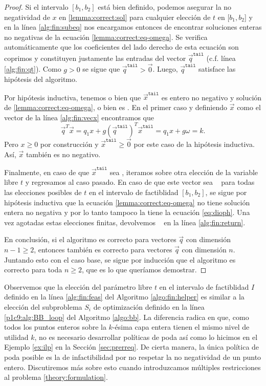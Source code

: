 \begin{proof}
	Si el intervalo $[b_1, b_2]$ está bien definido, podemos asegurar la no negatividad de $x$ en
	\eqref{lemma:correct:sol} para cualquier elección de $t$ en $[b_1, b_2$] y en
	la línea \ref{alg:fin:subeq} nos encargamos entonces de encontrar soluciones enteras no negativas
	de la ecuación \eqref{lemma:correct:eq-omega}. Se verifica automáticamente que los coeficientes
	del lado derecho de esta ecuación son coprimos y constituyen justamente las entradas del vector
	$\vec{q}^{\texttt{tail}}$ (c.f. línea \ref{alg:fin:qt}). Como $g > 0$ se sigue que
	$\vec{q}^{\texttt{tail}} > \vec{0}$. Luego, $\vec{q}^{\texttt{tail}}$ satisface las hipótesis
	del algoritmo.

	Por hipótesis inductiva, tenemos o bien que $\vec{x}^{\texttt{tail}}$ es entero no negativo y
	solución de \eqref{lemma:correct:eq-omega}, o bien es \NIL. En el primer caso y definiendo
	$\vec{x}$ como el vector de la línea \ref{alg:fin:vecx} encontramos que
	\begin{equation*}
		\vec{q}^T\vec{x} = q_1x + g\left(\vec{q}^{\texttt{tail}}\right)^T\vec{x}^{\texttt{tail}}
		= q_1x + g\omega = k.
	\end{equation*}
	Pero $x \geq 0$ por construcción y $\vec{x}^{\texttt{tail}} \geq \vec{0}$ por este caso de la
	hipótesis inductiva. Así, $\vec{x}$ también es no negativo.

	Finalmente, en caso de que $\vec{x}^{\texttt{tail}}$ sea \NIL, iteramos sobre otra elección de
	la variable libre $t$ y regresamos al caso pasado. En caso de que este vector sea \NIL~ para
	todas las elecciones posibles de $t$ en el intervalo de factiblidad $[b_1, b_2]$, se sigue por
	hipótesis inductiva que la ecuación \eqref{lemma:correct:eq-omega} no tiene solución entera no
	negativa y por lo tanto tampoco la tiene la ecuación \eqref{eq:dioph}. Una vez agotadas estas
	elecciones finitas, devolvemos \NIL~ en la línea \ref{alg:fin:return}.

	En conclusión, si el algoritmo es correcto para vectores $\vec{q}$ con dimensión $n - 1 \geq 2$,
	entonces también es correcto para vectores $\vec{q}$ con dimensión $n$. Juntando esto con el
	caso base, se sigue por inducción que el algoritmo es correcto para toda $n \geq 2$, que es lo
	que queríamos demostrar.
\end{proof}

Observemos que la elección del parámetro libre $t$ en el intervalo de factiblidad $I$ definido en la
línea \ref{alg:fin:feas} del Algoritmo \ref{algo:fin:helper} es similar a la elección del
subproblema $S_i$ de optimización definido en la línea \ref{p1c9:alg:BB_loop} del Algoritmo
\ref{algo:bb}. La diferencia radica en que, como todos los puntos enteros sobre la $k$-ésima capa
entera tienen el mismo nivel de utilidad $k$, no es necesario desarrollar políticas de poda así como
lo hicimos en el Ejemplo \ref{ex:ilp} en la Sección \ref{sec:prerreq}. De cierta manera, la única
política de poda posible es la de infactibilidad por no respetar la no negatividad de un punto
entero. Discutiremos más sobre esto cuando introduzcamos múltiples restricciones al problema
\eqref{theory:formulation}.


